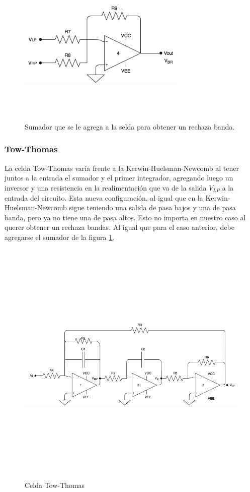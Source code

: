 \begin{figure}[H] %
	\centering
	\includegraphics[width=8cm,height=8cm,keepaspectratio]{../EJ4/imagenes/sumador_extra.png}
	\caption{Sumador que se le agrega a la selda para obtener un rechaza banda.}
	\label{sumador_extra}
\end{figure}

\subsubsection{Tow-Thomas}

La celda Tow-Thomas var\'ia frente a la Kerwin-Huelsman-Newcomb al tener juntos a la entrada el sumador y el primer integrador, agregando luego un inversor y una resistencia en la realimentación que va de la salida $V_{LP}$ a la entrada del circuito. Esta nueva configuraci\'on, al igual que en la Kerwin-Huelsman-Newcomb sigue teniendo una salida de pasa bajos y una de pasa banda, pero ya no tiene una de pasa altos. Esto no importa en nuestro caso al querer obtener un rechaza bandas. Al igual que para el caso anterior, debe agregarse el sumador de la figura \ref{sumador_extra}.

\begin{figure}[H] %
	\centering
	\includegraphics[width=12cm,height=12cm,keepaspectratio]{../EJ4/imagenes/TOW-THOMAS.png}
	\caption{Celda Tow-Thomas}
	\label{tow_thomas}
\end{figure}

